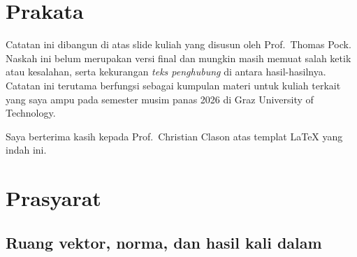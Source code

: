 \chapter*{Prakata}
\enlargethispage*{2cm}

Catatan ini dibangun di atas slide kuliah yang disusun oleh Prof.~Thomas Pock.
Naskah ini belum merupakan versi final dan mungkin masih memuat salah ketik atau
kesalahan, serta kekurangan \emph{teks penghubung} di antara hasil-hasilnya. Catatan
ini terutama berfungsi sebagai kumpulan materi untuk kuliah terkait yang saya ampu
pada semester musim panas 2026 di Graz University of Technology.

Saya berterima kasih kepada Prof.~Christian Clason atas templat \LaTeX{} yang indah ini.

\chapter{Prasyarat}

\section{Ruang vektor, norma, dan hasil kali dalam}

